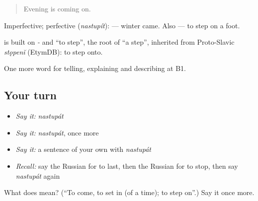 \begin{quote}
Evening is coming on.
\end{quote}

Imperfective; perfective \emph{} (\emph{nastupít}): \emph{ } — winter came. Also \emph{  } — to step on a foot.

\begin{cousinweb}
\emph{} is built on \emph{-} and \emph{} \textquotedblleft{}to step\textquotedblright{}, the root of \emph{} \textquotedblleft{}a step\textquotedblright{}, inherited from Proto-Slavic \emph{stǫpenĭ} (EtymDB): to step onto.
\end{cousinweb}

\begin{grammarlens}[title={What you've built}]
One more word for telling, explaining and describing at B1.
\end{grammarlens}

\subsection*{Your turn}
\begin{itemize}
\raggedright
  \item \emph{Say it:} \emph{nastupát}
  \item \emph{Say it:} \emph{nastupát}, once more
  \item \emph{Say it:} a sentence of your own with \emph{nastupát}
  \item \emph{Recall:} say the Russian for to last, then the Russian for to stop, then say \emph{nastupát} again
\end{itemize}

\begin{tcolorbox}[breakable,colback=teal!4,colframe=teal!35!black,title={Before you move on}]
What does  mean? (\textquotedblleft{}To come, to set in (of a time); to step on\textquotedblright{}.) Say it once more.
\end{tcolorbox}
